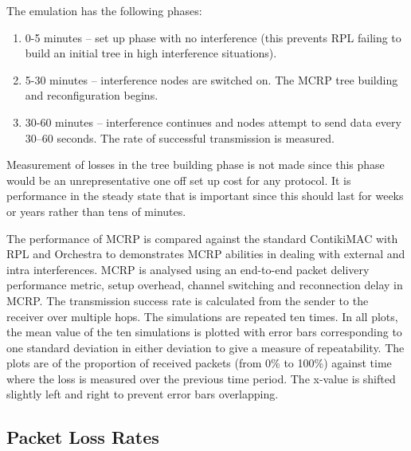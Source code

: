 The emulation has the following phases:
\begin{enumerate}
\item 0-5 minutes -- set up phase with no interference (this prevents RPL failing to build an initial tree in high interference situations).
\item 5-30 minutes -- interference nodes are switched on.  The MCRP tree building and reconfiguration begins.
\item 30-60 minutes -- interference continues and nodes attempt to send data every 30--60 seconds.  The rate of successful transmission is measured.
\end{enumerate}
Measurement of losses in the tree building phase is not made since this phase would be an unrepresentative one off set up cost for any protocol.  It is performance in the steady state that is important since this should last for weeks or years rather than tens of minutes.

The performance of MCRP is compared against the standard ContikiMAC with RPL and Orchestra to demonstrates MCRP abilities in dealing with external and intra interferences. 
MCRP is analysed using an end-to-end packet delivery performance metric, setup overhead, channel switching and reconnection delay in MCRP. The transmission success rate is calculated from the sender to the receiver over multiple hops. 
The simulations are repeated ten times. In all plots, the mean value of the ten simulations is plotted with error bars corresponding to one standard deviation in either deviation to give a measure of repeatability. The plots are of the proportion of received packets (from 0\% to 100\%) against time where the loss is measured over the previous time period.  The x-value is shifted slightly left and right to prevent error bars overlapping.

\subsection{Packet Loss Rates}


